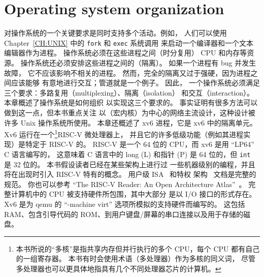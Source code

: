 
\chapter{Operating system organization}
\label{CH:FIRST}

对操作系统的一个关键要求是同时支持多个活动。例如，
人们可以使用 Chapter~\ref{CH:UNIX} 中的 {\tt fork} 和 {\tt exec} 系统调用
来启动一个编译器和一个文本编辑器作为进程。
操作系统必须在这些进程之间（时分复用）
CPU 和内存等资源。
操作系统还必须安排这些进程之间的（隔离）。
如果一个进程有 bug 并发生故障，
它不应该影响不相关的进程。
然而，完全的隔离又过于强硬，因为进程之间应该能够
有意地进行交互；管道就是一个例子。
因此，
一个操作系统必须满足三个要求：多路复用（multiplexing）、隔离（isolation）
和交互（interaction）。
本章概述了操作系统是如何组织
以实现这三个要求的。
事实证明有很多方法可以做到这一点，但本书重点关注
以（宏内核）为中心的网络主流设计，这种设计被许多
Unix 操作系统所使用。
本章还概述了 
xv6 进程，它是 xv6 中的隔离单元。
Xv6 运行在一个\footnote{
本书所说的“多核”是指共享内存但并行执行的多个 CPU，每个 CPU 都有自己的一组寄存器。
本书有时会使用术语（多处理器）作为多核的同义词，
尽管多处理器也可以更具体地指具有几个不同处理器芯片的计算机。}RISC-V 微处理器上，
并且它的许多低级功能（例如其进程实现）是特定于 
RISC-V 的。
RISC-V 是一个 64 位的 CPU，而 xv6 是用 “LP64” C 语言编写的，
这意味着 C 语言中的 long (L) 和指针 (P) 
是 64 位的，但 {\tt int} 是 32 位的。
本书假设读者已经在某些架构上进行过
一些机器级别的编程，并且将在出现时引入 
RISC-V 特有的概念。
用户级 ISA~\cite{riscv:user} 和特权
架构~\cite{riscv:priv} 文档是完整的规范。
你也可以参考 
“The RISC-V Reader: An Open Architecture Atlas”~\cite{riscv}。
完整计算机中的 CPU 被支持硬件所包围，其中大部分
是以 I/O 接口的形式存在。
Xv6 是为 qemu 的 “-machine virt” 选项所模拟的支持硬件而编写的。
这包括 
RAM、包含引导代码的 ROM、到用户键盘/屏幕的串口连接以及用于存储的磁盘。
